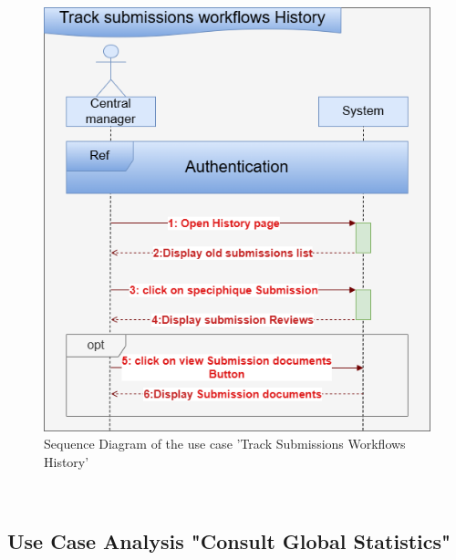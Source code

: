 \begin{figure}[h!]
    \centering
    \includegraphics[width=1\textwidth]{figures/seq track sub workflow history.png}
    \caption{Sequence Diagram of the use case 'Track Submissions Workflows History'}
\end{figure}\

\clearpage
\subsection{Use Case Analysis "Consult Global Statistics"}
